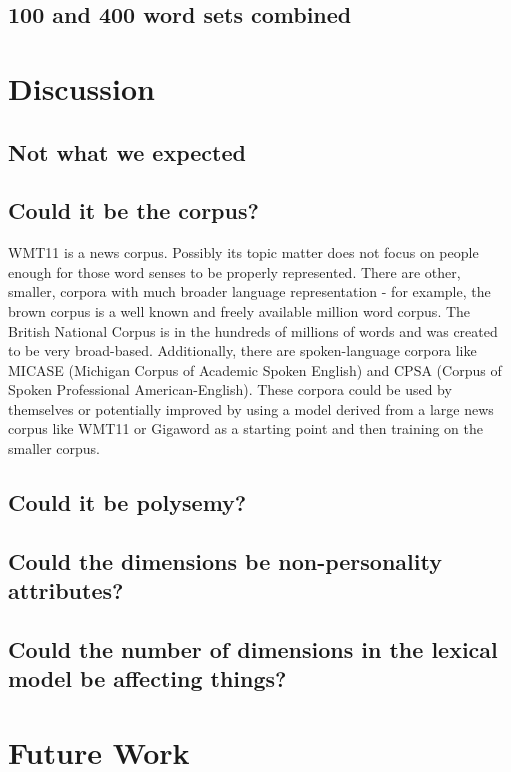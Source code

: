\documentclass[10pt,letterpaper]{article}
\begin{document}
\subsection{100 and 400 word sets combined}

\section{Discussion}

\subsection{Not what we expected}

\subsection{Could it be the corpus?}

WMT11 is a news corpus. Possibly its topic matter does not focus on people enough for those word senses to be properly represented. There are other, smaller, corpora with much broader language representation - for example, the brown corpus is a well known and freely available million word corpus. The British National Corpus is in the hundreds of millions of words and was created to be very broad-based. Additionally, there are spoken-language corpora like MICASE (Michigan Corpus of Academic Spoken English) and CPSA (Corpus of Spoken Professional American-English). These corpora could be used by themselves or potentially improved by using a model derived from a large news corpus like WMT11 or Gigaword as a starting point and then training on the smaller corpus.

\subsection{Could it be polysemy?}

\subsection{Could the dimensions be non-personality attributes?}

\subsection{Could the number of dimensions in the lexical model be affecting things?}

\section{Future Work}
\end{document}
